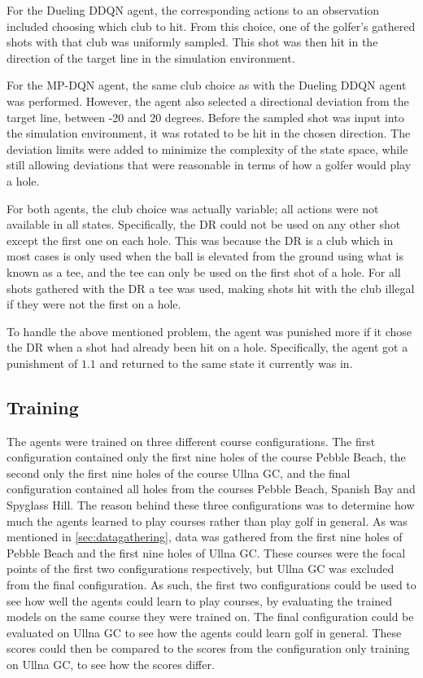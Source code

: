 \documentclass{kththesis}
\begin{document}
For the Dueling DDQN agent, the corresponding actions to an observation included choosing which club to hit. From this choice, one of the golfer's gathered shots with that club was uniformly sampled. This shot was then hit in the direction of the target line in the simulation environment.

For the MP-DQN agent, the same club choice as with the Dueling DDQN agent was performed. However, the agent also selected a directional deviation from the target line, between -20 and 20 degrees. Before the sampled shot was input into the simulation environment, it was rotated to be hit in the chosen direction. The deviation limits were added to minimize the complexity of the state space, while still allowing deviations that were reasonable in terms of how a golfer would play a hole.

For both agents, the club choice was actually variable; all actions were not available in all states. Specifically, the DR could not be used on any other shot except the first one on each hole. This was because the DR is a club which in most cases is only used when the ball is elevated from the ground using what is known as a tee, and the tee can only be used on the first shot of a hole. For all shots gathered with the DR a tee was used, making shots hit with the club illegal if they were not the first on a hole.

To handle the above mentioned problem, the agent was punished more if it chose the DR when a shot had already been hit on a hole. Specifically, the agent got a punishment of $1.1$ and returned to the same state it currently was in. 

\subsection{Training}
\label{sec:rltraining}
The agents were trained on three different course configurations. The first configuration contained only the first nine holes of the course Pebble Beach, the second only the first nine holes of the course Ullna GC, and the final configuration contained all holes from the courses Pebble Beach, Spanish Bay and Spyglass Hill. The reason behind these three configurations was to determine how much the agents learned to play courses rather than play golf in general. As was mentioned in \autoref{sec:datagathering}, data was gathered from the first nine holes of Pebble Beach and the first nine holes of Ullna GC. These courses were the focal points of the first two configurations respectively, but Ullna GC was excluded from the final configuration. As such, the first two configurations could be used to see how well the agents could learn to play courses, by evaluating the trained models on the same course they were trained on. The final configuration could be evaluated on Ullna GC to see how the agents could learn golf in general. These scores could then be compared to the scores from the configuration only training on Ullna GC, to see how the scores differ.
\end{document}
